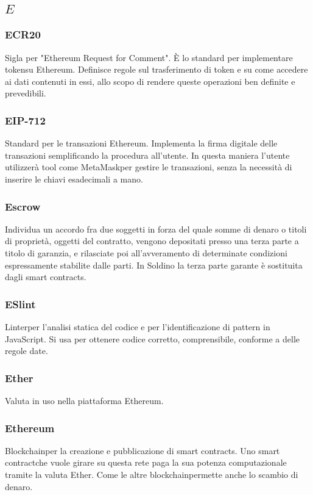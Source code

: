 \subsection*{\quad$E\quad$}
\subsubsection*{ECR20}
Sigla per "Ethereum Request for Comment". È lo standard per implementare token\glosp su Ethereum. Definisce regole sul trasferimento di token e su come accedere ai dati contenuti in essi, allo scopo di rendere queste operazioni ben definite e prevedibili.

\subsubsection*{EIP-712}
Standard per le transazioni Ethereum. Implementa la firma digitale delle transazioni semplificando la procedura all'utente. In questa maniera l'utente utilizzerà tool come MetaMask\glosp per gestire le transazioni, senza la necessità di inserire le chiavi esadecimali a mano.

\subsubsection*{Escrow}
Individua un accordo fra due soggetti in forza del quale somme di denaro o titoli di proprietà, oggetti del contratto, vengono depositati presso una terza parte a titolo di garanzia, e rilasciate poi all'avveramento di determinate condizioni espressamente stabilite dalle parti. In Soldino la terza parte garante è sostituita dagli smart contracts\glo.

\subsubsection*{ESlint}
Linter\glo per l’analisi statica del codice e per l’identificazione di pattern in JavaScript. Si usa per ottenere codice corretto, comprensibile, conforme a delle regole date.

\subsubsection*{Ether}
Valuta in uso nella piattaforma Ethereum\glo.

\subsubsection*{Ethereum}
Blockchain\glosp per la creazione e pubblicazione di smart contracts\glo. Uno smart contract\glosp che vuole girare su questa rete paga la sua potenza computazionale tramite la valuta Ether. Come le altre blockchain\glosp permette anche lo scambio di denaro.

